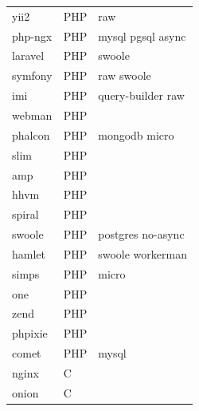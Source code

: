 \begin{longtable}{lll}
    yii2             & PHP         & raw                                                \\
    php-ngx          & PHP         & mysql pgsql async                                  \\
    laravel          & PHP         & swoole                                             \\
    symfony          & PHP         & raw swoole                                         \\
    imi              & PHP         & query-builder raw                                  \\
    webman           & PHP         &                                                    \\
    phalcon          & PHP         & mongodb micro                                      \\
    slim             & PHP         &                                                    \\
    amp              & PHP         &                                                    \\
    hhvm             & PHP         &                                                    \\
    spiral           & PHP         &                                                    \\
    swoole           & PHP         & postgres no-async                                  \\
    hamlet           & PHP         & swoole workerman                                   \\
    simps            & PHP         & micro                                              \\
    one              & PHP         &                                                    \\
    zend             & PHP         &                                                    \\
    phpixie          & PHP         &                                                    \\
    comet            & PHP         & mysql                                              \\
    nginx            & C           &                                                    \\
    onion            & C           &                                                    \\

\end{longtable}

